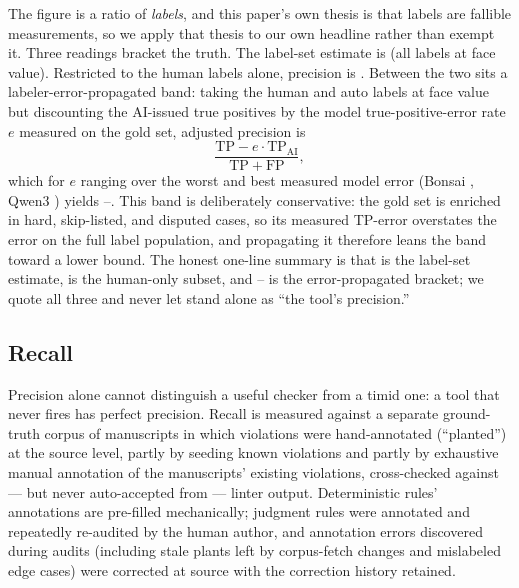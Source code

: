 \documentclass[nojss,article]{jss}
\begin{document}
The \StatPrecisionOverall{} figure is a ratio of \emph{labels}, and
this paper's own thesis is that labels are fallible measurements, so
we apply that thesis to our own headline rather than exempt it. Three
readings bracket the truth. The label-set estimate is
\StatPrecisionOverall{} (all labels at face value). Restricted to the
\StatLabelsHuman{} human labels alone, precision is
\StatPrecisionHumanOnly{}. Between the two sits a
labeler-error-propagated band: taking the human and auto labels at
face value but discounting the AI-issued true positives by the
model true-positive-error rate $e$ measured on the gold set, adjusted
precision is
\[
  \frac{\mathrm{TP} - e\cdot\mathrm{TP}_{\mathrm{AI}}}
       {\mathrm{TP} + \mathrm{FP}},
\]
which for $e$ ranging over the worst and best measured model error
(Bonsai \StatGoldTPErrBonsai{}, Qwen3 \StatGoldTPErrQwen{}) yields
\StatPrecisionAdjLow{}--\StatPrecisionAdjHigh{}. This band is
deliberately conservative: the gold set is enriched in hard,
skip-listed, and disputed cases, so its measured TP-error overstates
the error on the full label population, and propagating it therefore
leans the band toward a lower bound. The honest one-line summary is
that \StatPrecisionOverall{} is the label-set estimate,
\StatPrecisionHumanOnly{} is the human-only subset, and
\StatPrecisionAdjLow{}--\StatPrecisionAdjHigh{} is the
error-propagated bracket; we quote all three and never let
\StatPrecisionOverall{} stand alone as ``the tool's precision.''

\subsection{Recall}
\label{sec:recall}

Precision alone cannot distinguish a useful checker from a timid one:
a tool that never fires has perfect precision. Recall is measured
against a separate ground-truth corpus of
\StatRecallCorpusPapers{} manuscripts in which violations were
hand-annotated (``planted'') at the source level, partly by seeding
known violations and partly by exhaustive manual annotation of the
manuscripts' existing violations, cross-checked against --- but never
auto-accepted from --- linter output. Deterministic rules'
annotations are pre-filled mechanically; judgment rules were
annotated and repeatedly re-audited by the human author, and
annotation errors discovered during audits (including stale plants
left by corpus-fetch changes and mislabeled edge cases) were
corrected at source with the correction history retained.
\end{document}
